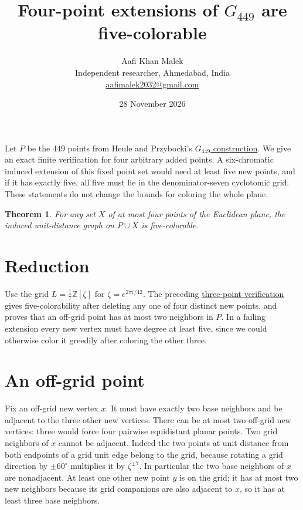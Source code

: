 \documentclass[11pt,letterpaper]{article}
\title{Four-point extensions of \(G_{449}\) are five-colorable}
\author{Aafi Khan Malek\\ \small Independent researcher, Ahmedabad, India\\
\small\href{mailto:aafimalek2032@gmail.com}{aafimalek2032@gmail.com}}
\date{28 November 2026}
\newtheorem{theorem}{Theorem}
\begin{document}
\maketitle
Let \(P\) be the 449 points from Heule and Przybocki's
\href{https://arxiv.org/abs/2611.28518}{\(G_{449}\) construction}.
We give an exact finite verification for four arbitrary added points.
A six-chromatic induced extension of this fixed point set would
need at least five new points, and if it has exactly five, all five
must lie in the denominator-seven cyclotomic grid. These statements
do not change the bounds for coloring the whole plane.

\begin{theorem}
For any set \(X\) of at most four points of the Euclidean plane,
the induced unit-distance graph on \(P\cup X\) is five-colorable.
\end{theorem}

\section{Reduction}
Use the grid \(L=\tfrac17\mathbb Z[\zeta]\) for
\(\zeta=e^{2\pi i/42}\). The preceding
\href{https://github.com/Aafimalek/novel-discoveries/blob/6caa1be3f702e8f1b1b56ef5497eea6e885ccfd7/hadwiger-nelson/verification/g449/prime-seven-catalogue/paper/three-point-extensions.pdf}
{three-point verification} gives five-colorability after deleting any
one of four distinct new points, and proves that an off-grid point
has at most two neighbors in \(P\). In a failing extension every new
vertex must have degree at least five, since we could otherwise color
it greedily after coloring the other three.

\section{An off-grid point}
Fix an off-grid new vertex \(x\). It must have exactly two base
neighbors and be adjacent to the three other new vertices. There
can be at most two off-grid new vertices: three would force four
pairwise equidistant planar points. Two grid neighbors of \(x\)
cannot be adjacent. Indeed the two points at unit distance from
both endpoints of a grid unit edge belong to the grid, because
rotating a grid direction by \(\pm60^\circ\) multiplies it by
\(\zeta^{\pm7}\). In particular the two base neighbors of \(x\)
are nonadjacent. At least one other new point \(y\) is on the grid;
it has at most two new neighbors because its grid companions are
also adjacent to \(x\), so it has at least three base neighbors.
\end{document}
